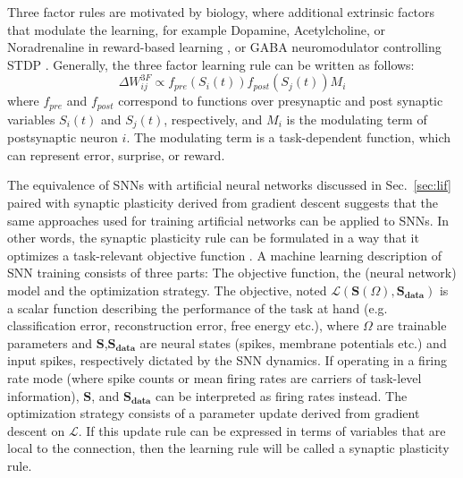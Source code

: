 \documentclass[english]{article}
\newcommand{\refsec}[1]{{Sec.~\ref{#1}}}
\renewcommand{\cite}{\citep}
\begin{document}
Three factor rules are motivated by biology, where additional extrinsic factors that modulate the learning, for example Dopamine, Acetylcholine, or Noradrenaline in reward-based learning \cite{Schultz02_gettform}, or GABA neuromodulator controlling \acl{STDP} \cite{paille2019gaba}. Generally, the three factor learning rule can be written as follows: 
\begin{equation}\label{eq:3f_rule}
  \Delta W_{ij}^{3F} \propto f_{pre}(S_i(t)) f_{post}(S_j(t)) M_i
\end{equation}
where $f_{pre}$ and $f_{post}$ correspond to functions over presynaptic and post synaptic variables $S_i(t)$ and $S_j(t)$, respectively, and $M_i$ is the modulating term of postsynaptic neuron $i$. The modulating term is a task-dependent function, which can represent error, surprise, or reward.  

The equivalence of \acp{SNN} with artificial neural networks discussed in \refsec{sec:lif} paired with synaptic plasticity derived from gradient descent suggests that the same approaches used for training artificial networks can be applied to \acp{SNN}.
In other words, the synaptic plasticity rule can be formulated in a way that it optimizes a task-relevant objective function \cite{Neftci18_datapowe}.
A machine learning description of \ac{SNN} training consists of three parts: The objective function, the (neural network) model and the optimization strategy.
The objective, noted $\mathcal{L}(\mathbf{S}(\Omega),\mathbf{S_{data}})$ is a scalar function describing the performance of the task at hand (e.g. classification error, reconstruction error, free energy etc.), where $\Omega$ are trainable parameters and $\mathbf{S}$,$\mathbf{S_{data}}$ are neural states (spikes, membrane potentials etc.) and input spikes, respectively dictated by the \ac{SNN} dynamics. 
If operating in a firing rate mode (where spike counts or mean firing rates are carriers of task-level information),  $\mathbf{S}$, and $\mathbf{S_{data}}$ can be interpreted as firing rates instead.
The optimization strategy consists of a parameter update derived from gradient descent on $\mathcal{L}$.
If this update rule can be expressed in terms of variables that are local to the connection, then the learning rule will be called a synaptic plasticity rule.
\end{document}
